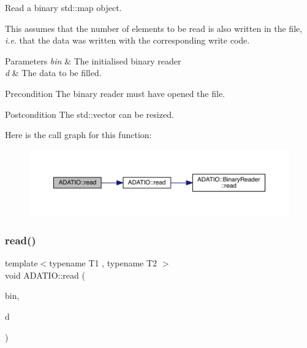 Read a binary std\+::map object. 

This assumes that the number of elements to be read is also written in the file, {\itshape i.\+e}. that the data was written with the corresponding write code. 
\begin{DoxyParams}{Parameters}
{\em bin} & The initialised binary reader \\
\hline
{\em d} & The data to be filled.\\
\hline
\end{DoxyParams}
\begin{DoxyPrecond}{Precondition}
The binary reader must have opened the file. 
\end{DoxyPrecond}
\begin{DoxyPostcond}{Postcondition}
The std\+::vector can be resized. 
\end{DoxyPostcond}
Here is the call graph for this function\+:
\nopagebreak
\begin{figure}[H]
\begin{center}
\leavevmode
\includegraphics[width=350pt]{d0/dba/namespaceADATIO_aae6ee71c391ad98e959febc86231331b_cgraph}
\end{center}
\end{figure}
\mbox{\label{namespaceADATIO_a746a6511817f141011d50005a099feec}} 
\subsubsection{\texorpdfstring{read()}{read()}\hspace{0.1cm}{\footnotesize\ttfamily [28/28]}}
{\footnotesize\ttfamily template$<$typename T1 , typename T2 $>$ \\
void A\+D\+A\+T\+I\+O\+::read (\begin{DoxyParamCaption}\item[{\mbox{\hyperlink{classADATIO_1_1BinaryReader}{Binary\+Reader}} \&}]{bin,  }\item[{std\+::pair$<$ T1, T2 $>$ \&}]{d }\end{DoxyParamCaption})\hspace{0.3cm}{\ttfamily [inline]}}



